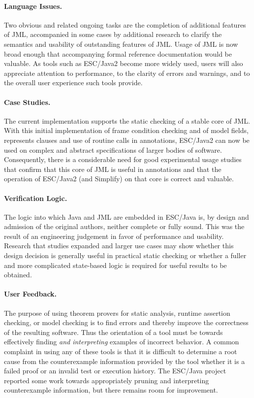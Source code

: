 \documentclass{acm_proc_article-sp}
\begin{document}
\paragraph*{Language Issues.} Two obvious and related ongoing tasks are
the completion of additional features of JML, accompanied in some
cases by additional research to clarify the semantics and usability of
outstanding features of JML.  Usage of JML is now broad enough that
accompanying formal reference documentation would be valuable.  As
tools such as ESC/Java2 become more widely used, users will also
appreciate attention to performance, to the clarity of errors and
warnings, and to the overall user experience such tools provide.

\paragraph*{Case Studies.} The current implementation supports the
static checking of a stable core of JML.  With this initial
implementation of frame condition checking and of model fields,
represents clauses and use of routine calls in annotations, ESC/Java2
can now be used on complex and abstract specifications of larger
bodies of software.  Consequently, there is a considerable need for
good experimental usage studies that confirm that this core of JML is
useful in annotations and that the operation of ESC/Java2 (and
Simplify) on that core is correct and valuable.

\paragraph*{Verification Logic.} The logic into which Java and JML are
embedded in ESC/Java is, by design and admission of the original
authors, neither complete or fully sound.  This was the result of an
engineering judgement in favor of performance and usability.  Research
that studies expanded and larger use cases may show whether this
design decision is generally useful in practical static checking or
whether a fuller and more complicated state-based logic is required
for useful results to be obtained.

\paragraph*{User Feedback.} The purpose of using theorem provers for
static analysis, runtime assertion checking, or model checking is to
find errors and thereby improve the correctness of the resulting
software.  Thus the orientation of a tool must be towards effectively
finding {\em and interpreting} examples of incorrect behavior.  A
common complaint in using any of these tools is that it is difficult
to determine a root cause from the counterexample information provided
by the tool whether it is a failed proof or an invalid test or
execution history.  The ESC/Java project reported some work towards
appropriately pruning and interpreting counterexample information, but
there remains room for improvement.
\end{document}
